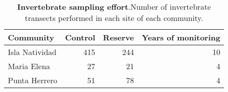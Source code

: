 \begin{table}[t]

\caption{\label{tab:}{\bf Invertebrate sampling effort}.Number of invertebrate transects performed in each site of each community.}
\centering
\begin{tabular}{lrrr}
\toprule
Community & Control & Reserve & Years of monitoring\\
\midrule
Isla Natividad & 415 & 244 & 10\\
Maria Elena & 27 & 21 & 4\\
Punta Herrero & 51 & 78 & 4\\
\bottomrule
\end{tabular}
\end{table}